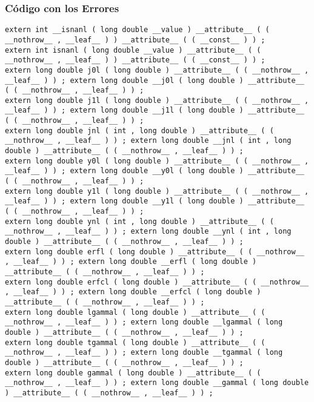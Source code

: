 \documentclass{beamer}
\begin{document}
\begin{frame}[fragile]
\frametitle{C\'odigo con los Errores}
\begin{verbatim}
extern int __isnanl ( long double __value ) __attribute__ ( ( __nothrow__ , __leaf__ ) ) __attribute__ ( ( __const__ ) ) ; 
extern int isnanl ( long double __value ) __attribute__ ( ( __nothrow__ , __leaf__ ) ) __attribute__ ( ( __const__ ) ) ; 
extern long double j0l ( long double ) __attribute__ ( ( __nothrow__ , __leaf__ ) ) ; extern long double __j0l ( long double ) __attribute__ ( ( __nothrow__ , __leaf__ ) ) ; 
extern long double j1l ( long double ) __attribute__ ( ( __nothrow__ , __leaf__ ) ) ; extern long double __j1l ( long double ) __attribute__ ( ( __nothrow__ , __leaf__ ) ) ; 
extern long double jnl ( int , long double ) __attribute__ ( ( __nothrow__ , __leaf__ ) ) ; extern long double __jnl ( int , long double ) __attribute__ ( ( __nothrow__ , __leaf__ ) ) ; 
extern long double y0l ( long double ) __attribute__ ( ( __nothrow__ , __leaf__ ) ) ; extern long double __y0l ( long double ) __attribute__ ( ( __nothrow__ , __leaf__ ) ) ; 
extern long double y1l ( long double ) __attribute__ ( ( __nothrow__ , __leaf__ ) ) ; extern long double __y1l ( long double ) __attribute__ ( ( __nothrow__ , __leaf__ ) ) ; 
extern long double ynl ( int , long double ) __attribute__ ( ( __nothrow__ , __leaf__ ) ) ; extern long double __ynl ( int , long double ) __attribute__ ( ( __nothrow__ , __leaf__ ) ) ; 
extern long double erfl ( long double ) __attribute__ ( ( __nothrow__ , __leaf__ ) ) ; extern long double __erfl ( long double ) __attribute__ ( ( __nothrow__ , __leaf__ ) ) ; 
extern long double erfcl ( long double ) __attribute__ ( ( __nothrow__ , __leaf__ ) ) ; extern long double __erfcl ( long double ) __attribute__ ( ( __nothrow__ , __leaf__ ) ) ; 
extern long double lgammal ( long double ) __attribute__ ( ( __nothrow__ , __leaf__ ) ) ; extern long double __lgammal ( long double ) __attribute__ ( ( __nothrow__ , __leaf__ ) ) ; 
extern long double tgammal ( long double ) __attribute__ ( ( __nothrow__ , __leaf__ ) ) ; extern long double __tgammal ( long double ) __attribute__ ( ( __nothrow__ , __leaf__ ) ) ; 
extern long double gammal ( long double ) __attribute__ ( ( __nothrow__ , __leaf__ ) ) ; extern long double __gammal ( long double ) __attribute__ ( ( __nothrow__ , __leaf__ ) ) ; 
\end{verbatim}
\end{frame}
\end{document}
